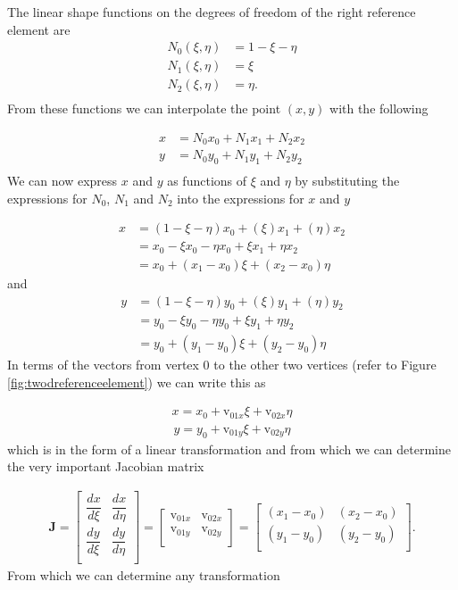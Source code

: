 \documentclass[10pt,letterpaper,notitlepage]{article}
\numberwithin{equation}{section}
\newcommand{\beq}{\begin{equation*}
\begin{aligned}}
\newcommand{\eeq}{\end{aligned}
\end{equation*}}
\newcommand{\beqn}{\begin{equation}
	\begin{aligned}}
\newcommand{\eeqn}{\end{aligned}
	\end{equation}}
\begin{document}
The linear shape functions on the degrees of freedom of the right reference element are 
\beq 
N_0(\xi,\eta) &= 1 - \xi - \eta \\
N_1(\xi,\eta) &= \xi \\
N_2(\xi,\eta) &= \eta. \\
\eeq 
From these functions we can interpolate the point $(x,y)$ with the following

\beq 
x &= N_0 x_0 + N_1 x_1 + N_2 x_2 \\
y &= N_0 y_0 + N_1 y_1 + N_2 y_2 \\
\eeq 
We can now express $x$ and $y$ as functions of $\xi$ and $\eta$ by substituting the expressions for $N_0$, $N_1$ and $N_2$ into the expressions for $x$ and $y$

\beq 
x &= (1-\xi-\eta)x_0 + (\xi)x_1 + (\eta)x_2 \\
&= x_0 -\xi x_0 -\eta x_0 +\xi x_1 +\eta x_2 \\
&= x_0 +(x_1 - x_0)\xi + (x_2 - x_0)\eta
\eeq 
and
\beq 
y &= (1-\xi-\eta)y_0 + (\xi)y_1 + (\eta)y_2 \\
&= y_0 -\xi y_0 -\eta y_0 +\xi y_1 +\eta y_2 \\
&= y_0 +(y_1 - y_0)\xi + (y_2 - y_0)\eta
\eeq 
\newline
In terms of the vectors from vertex $0$ to the other two vertices (refer to Figure \ref{fig:twodreferenceelement}) we can write this as

\beqn \label{eq:x2Dnat}
x = x_0 + \text{v}_{01x} \xi +\text{v}_{02x} \eta
\eeqn 
\beqn \label{eq:y2Dnat}
y = y_0 + \text{v}_{01y} \xi +\text{v}_{02y} \eta
\eeqn 
\newline
which is in the form of a linear transformation and from which we can determine the very important Jacobian matrix

\begingroup
\renewcommand*{\arraystretch}{1.5}
\beqn \label{eq:jacobiantriangle} 
\mathbf{J }= 
\begin{bmatrix}
\dfrac{dx}{d\xi}     & \dfrac{dx}{d\eta} \\
\dfrac{dy}{d\xi}     & \dfrac{dy}{d\eta} \\
\end{bmatrix}=
\begin{bmatrix}
\text{v}_{01x}  & \text{v}_{02x}  \\
\text{v}_{01y}  & \text{v}_{02y}  \\
\end{bmatrix}
=
\begin{bmatrix}
(x_1 - x_0) & (x_2 - x_0)  \\
(y_1 - y_0)  & (y_2 - y_0) \\
\end{bmatrix}.
\eeqn
\endgroup
\newline
\newline
From which we can determine any transformation
\end{document}
